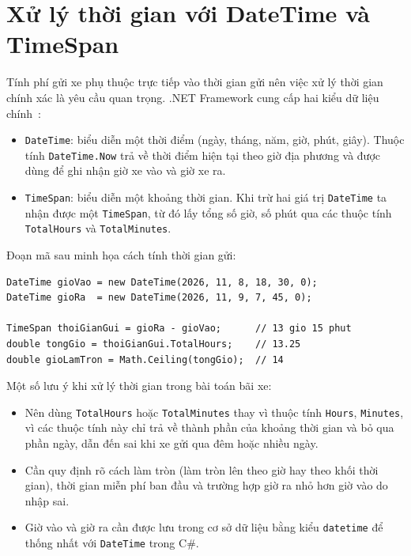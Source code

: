 \section{Xử lý thời gian với DateTime và TimeSpan}

Tính phí gửi xe phụ thuộc trực tiếp vào thời gian gửi nên việc xử lý thời gian chính xác là yêu cầu quan trọng. .NET Framework cung cấp hai kiểu dữ liệu chính~\cite{msdocs_datetime}:

\begin{itemize}
  \item \texttt{DateTime}: biểu diễn một thời điểm (ngày, tháng, năm, giờ, phút, giây). Thuộc tính \texttt{DateTime.Now} trả về thời điểm hiện tại theo giờ địa phương và được dùng để ghi nhận giờ xe vào và giờ xe ra.
  \item \texttt{TimeSpan}: biểu diễn một khoảng thời gian. Khi trừ hai giá trị \texttt{DateTime} ta nhận được một \texttt{TimeSpan}, từ đó lấy tổng số giờ, số phút qua các thuộc tính \texttt{TotalHours} và \texttt{TotalMinutes}.
\end{itemize}

Đoạn mã sau minh họa cách tính thời gian gửi:

\begin{lstlisting}
DateTime gioVao = new DateTime(2026, 11, 8, 18, 30, 0);
DateTime gioRa  = new DateTime(2026, 11, 9, 7, 45, 0);

TimeSpan thoiGianGui = gioRa - gioVao;      // 13 gio 15 phut
double tongGio = thoiGianGui.TotalHours;    // 13.25
double gioLamTron = Math.Ceiling(tongGio);  // 14
\end{lstlisting}

Một số lưu ý khi xử lý thời gian trong bài toán bãi xe:

\begin{itemize}
  \item Nên dùng \texttt{TotalHours} hoặc \texttt{TotalMinutes} thay vì thuộc tính \texttt{Hours}, \texttt{Minutes}, vì các thuộc tính này chỉ trả về thành phần của khoảng thời gian và bỏ qua phần ngày, dẫn đến sai khi xe gửi qua đêm hoặc nhiều ngày.
  \item Cần quy định rõ cách làm tròn (làm tròn lên theo giờ hay theo khối thời gian), thời gian miễn phí ban đầu và trường hợp giờ ra nhỏ hơn giờ vào do nhập sai.
  \item Giờ vào và giờ ra cần được lưu trong cơ sở dữ liệu bằng kiểu \texttt{datetime} để thống nhất với \texttt{DateTime} trong C\#.
\end{itemize}

